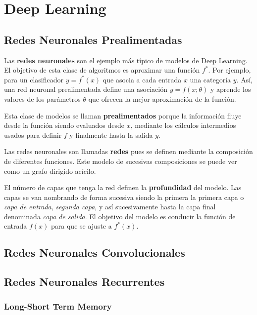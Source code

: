 \chapter{Deep Learning}

\section{Redes Neuronales Prealimentadas}

Las \textbf{redes neuronales} son el ejemplo más típico de modelos de Deep Learning. El objetivo de esta clase de algoritmos es aproximar una función $f^*$. Por ejemplo, para un clasificador $y = f^*(x)$ que asocia a cada entrada $x$ una categoría $y$. Así, una red neuronal prealimentada define una asociación $y = f(x; \theta)$ y aprende los valores de los parámetros $\theta$ que ofrecen la mejor aproximación de la función.

Esta clase de modelos se llaman \textbf{prealimentados} porque la información fluye desde la función siendo evaluados desde $x$, mediante los cálculos intermedios usados para definir $f$ y finalmente hasta la salida $y$. 

Las redes neuronales son llamadas \textbf{redes} pues se definen mediante la composición de diferentes funciones. Este modelo de sucesivas composiciones se puede ver como un grafo dirigido acícilo. 

El número de capas que tenga la red definen la \textbf{profundidad} del modelo. Las capas se van nombrando de forma sucesiva siendo la primera la primera capa o \textit{capa de entrada}, \textit{segunda capa}, y así sucesivamente hasta la capa final denominada \textit{capa de salida}. El objetivo del modelo es conducir la función de entrada $f(x)$ para que se ajuste a $f^*(x)$. 

\section{Redes Neuronales Convolucionales}



\section{Redes Neuronales Recurrentes}

\subsection{Long-Short Term Memory}